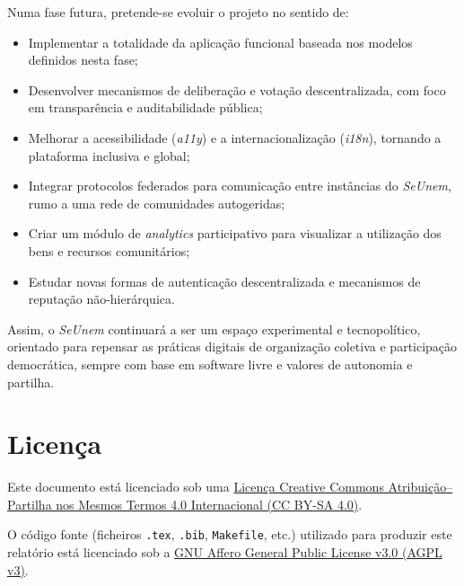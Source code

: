\documentclass[12pt,a4paper,openright,oneside]{memoir}
\begin{document}
Numa fase futura, pretende-se evoluir o projeto no sentido de:

\begin{itemize}
  \item Implementar a totalidade da aplicação funcional baseada nos modelos
      definidos nesta fase;
  \item Desenvolver mecanismos de deliberação e votação descentralizada, com
      foco em transparência e auditabilidade pública;
  \item Melhorar a acessibilidade (\textit{a11y}) e a internacionalização
      (\textit{i18n}), tornando a plataforma inclusiva e global;
  \item Integrar protocolos federados para comunicação entre instâncias do
      \textit{SeUnem}, rumo a uma rede de comunidades autogeridas;
  \item Criar um módulo de \textit{analytics} participativo para visualizar a
      utilização dos bens e recursos comunitários;
  \item Estudar novas formas de autenticação descentralizada e mecanismos de
      reputação não-hierárquica.
\end{itemize}

Assim, o \textit{SeUnem} continuará a ser um espaço experimental e
tecnopolítico, orientado para repensar as práticas digitais de organização
coletiva e participação democrática, sempre com base em software livre e
valores de autonomia e partilha.




\clearpage
\printbibliography[title={Referências Bibliográficas}]

\clearpage
\chapter*{Licença}
\noindent
Este documento está licenciado sob uma
\href{https://creativecommons.org/licenses/by-sa/4.0/}{Licença Creative Commons Atribuição–Partilha nos Mesmos Termos 4.0 Internacional (CC BY-SA 4.0)}.

\vspace{0.5cm}
O código fonte (ficheiros \texttt{.tex}, \texttt{.bib}, \texttt{Makefile}, etc.) utilizado para produzir este relatório está licenciado sob a
\href{https://www.gnu.org/licenses/agpl-3.0.html}{GNU Affero General Public License v3.0 (AGPL v3)}.

\clearpage
\appendix
\end{document}

